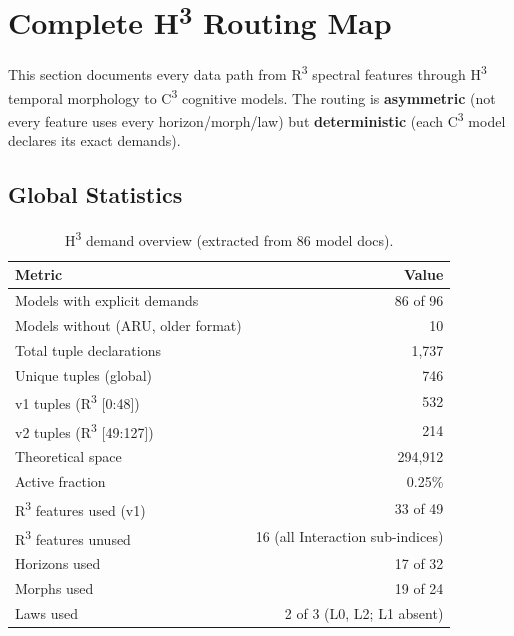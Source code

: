 
\section{Complete H\textsuperscript{3} Routing Map}
\label{sec:h3-routing}

This section documents every data path from R\textsuperscript{3} spectral
features through H\textsuperscript{3} temporal morphology to
C\textsuperscript{3} cognitive models.  The routing is
\textbf{asymmetric} (not every feature uses every horizon/morph/law)
but \textbf{deterministic} (each C\textsuperscript{3} model declares
its exact demands).

\subsection{Global Statistics}
\label{subsec:routing-stats}

\begin{table}[H]
\centering
\caption{H\textsuperscript{3} demand overview (extracted from 86 model docs).}
\label{tab:routing-overview}
\renewcommand{\arraystretch}{1.2}
\begin{tabular}{@{}lr@{}}
\toprule
\textbf{Metric} & \textbf{Value} \\
\midrule
Models with explicit demands            & 86 of 96 \\
Models without (ARU, older format)      & 10 \\
Total tuple declarations                & 1{,}737 \\
Unique tuples (global)                  & 746 \\
\quad v1 tuples (R\textsuperscript{3} [0:48])  & 532 \\
\quad v2 tuples (R\textsuperscript{3} [49:127]) & 214 \\
Theoretical space                       & 294{,}912 \\
Active fraction                         & 0.25\% \\
\midrule
R\textsuperscript{3} features used (v1) & 33 of 49 \\
R\textsuperscript{3} features unused    & 16 (all Interaction sub-indices) \\
Horizons used                           & 17 of 32 \\
Morphs used                             & 19 of 24 \\
Laws used                               & 2 of 3 (L0, L2; L1 absent) \\
\bottomrule
\end{tabular}
\end{table}

